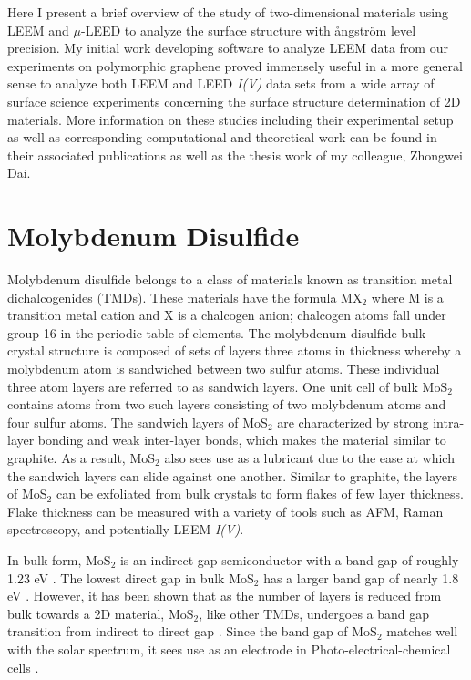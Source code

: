 Here I present a brief overview of the study of two-dimensional materials using LEEM and $\mu$-LEED to analyze the surface structure with {\aa}ngstr\"{o}m level precision. My initial work developing software to analyze LEEM data from our experiments on polymorphic graphene proved immensely useful in a more general sense to analyze both LEEM and LEED \textit{I(V)} data sets from a wide array of surface science experiments concerning the surface structure determination of 2D materials. More information on these studies including their experimental setup as well as corresponding computational and theoretical work can be found in their associated publications as well as the thesis work of my colleague, Zhongwei Dai.


\section{Molybdenum Disulfide}

Molybdenum disulfide belongs to a class of materials known as transition metal dichalcogenides (TMDs). These materials have the formula MX$_2$ where M is a transition metal cation and X is a chalcogen anion; chalcogen atoms fall under group 16 in the periodic table of elements. The molybdenum disulfide bulk crystal structure is composed of sets of layers three atoms in thickness whereby a molybdenum atom is sandwiched between two sulfur atoms. These individual three atom layers are referred to as sandwich layers. One unit cell of bulk MoS$_2$ contains atoms from two such layers consisting of two molybdenum atoms and four sulfur atoms. The sandwich layers of MoS$_2$ are characterized by strong intra-layer bonding and weak inter-layer bonds, which makes the material similar to graphite. As a result, MoS$_2$ also sees use as a lubricant due to the ease at which the sandwich layers can slide against one another. Similar to graphite, the layers of MoS$_2$ can be exfoliated from bulk crystals to form flakes of few layer thickness. Flake thickness can be measured with a variety of tools such as AFM, Raman spectroscopy, and potentially LEEM-\textit{I(V)}.

In bulk form, MoS$_2$ is an indirect gap semiconductor with a band gap of roughly 1.23 eV \cite{MoS2BulkGap}. The lowest direct gap in bulk MoS$_2$ has a larger band gap of nearly 1.8 eV \cite{TMD-bandgaps-ARPES}. However, it has been shown that as the number of layers is reduced from bulk towards a 2D material, MoS$_2$, like other TMDs, undergoes a band gap transition from indirect to direct gap \cite{Mos2GapTransition}. Since the band gap of MoS$_2$ matches well with the solar spectrum, it sees use as an electrode in Photo-electrical-chemical cells \cite{mos2-surfsci}.

